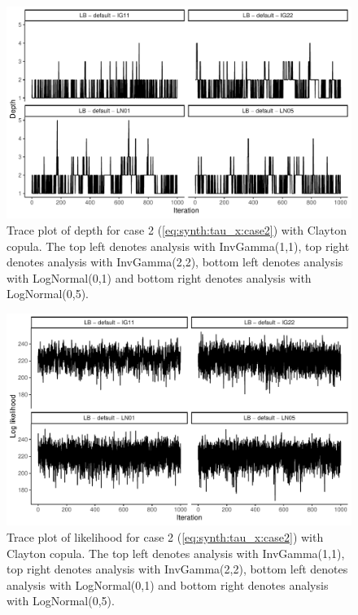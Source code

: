\documentclass{amsart}
\begin{document}
\begin{figure}
	\centering
	\includegraphics[width = 0.75\linewidth]{trace_case2_clayton_depth.pdf}
	\caption{Trace plot of depth for case 2 (\cref{eq:synth:tau_x:case2}) with Clayton copula. The top left denotes analysis with InvGamma(1,1), top right denotes analysis with InvGamma(2,2), bottom left denotes analysis with LogNormal(0,1) and bottom right denotes analysis with LogNormal(0,5).}
	\label{fig:case2:clayton:depth}
\end{figure}

\begin{figure}
	\centering
	\includegraphics[width = 0.75\linewidth]{trace_case2_clayton_like.pdf}
	\caption{Trace plot of likelihood for case 2 (\cref{eq:synth:tau_x:case2}) with Clayton copula. The top left denotes analysis with InvGamma(1,1), top right denotes analysis with InvGamma(2,2), bottom left denotes analysis with LogNormal(0,1) and bottom right denotes analysis with LogNormal(0,5).}
	\label{fig:case2:clayton:like}
\end{figure}
\end{document}
